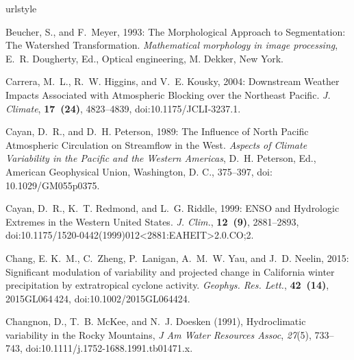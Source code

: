 \documentclass[final, double]{ua-thesis}
\begin{document}
\begin{thebibliography}{}
\providecommand{\natexlab}[1]{#1}
\providecommand{\url}[1]{\texttt{#1}}
\renewcommand{\UrlFont}{\rmfamily}
\providecommand{\urlprefix}{URL }
\expandafter\ifx\csname urlstyle\endcsname\relax
  \providecommand{\doi}[1]{doi:\discretionary{}{}{}#1}\else
  \providecommand{\doi}{doi:\discretionary{}{}{}\begingroup
  \urlstyle{rm}\Url}\fi
\providecommand{\eprint}[2][]{\url{#2}}

Beucher, S., and F.~Meyer, 1993: The {Morphological} {Approach} to
  {Segmentation}: {The} {Watershed} {Transformation}. \textit{Mathematical
  morphology in image processing}, E.~R. Dougherty, Ed., Optical engineering,
  M. Dekker, New York.

Carrera, M.~L., R.~W. Higgins, and V.~E. Kousky, 2004: Downstream {Weather}
  {Impacts} {Associated} with {Atmospheric} {Blocking} over the {Northeast}
  {Pacific}. \textit{J. Climate}, \textbf{17~(24)}, 4823--4839,
  \doi{10.1175/JCLI-3237.1}.

Cayan, D.~R., and D.~H. Peterson, 1989: The {Influence} of {North} {Pacific}
  {Atmospheric} {Circulation} on {Streamflow} in the {West}. \textit{Aspects of
  {Climate} {Variability} in the {Pacific} and the {Western} {Americas}}, D.~H.
  Peterson, Ed., American Geophysical Union, Washington, D. C., 375--397,
  doi: 10.1029/GM055p0375.

Cayan, D.~R., K.~T. Redmond, and L.~G. Riddle, 1999: {ENSO} and {Hydrologic}
  {Extremes} in the {Western} {United} {States}. \textit{J. Clim.},
  \textbf{12~(9)}, 2881--2893,
  \doi{10.1175/1520-0442(1999)012<2881:EAHEIT>2.0.CO;2}.

Chang, E. K.~M., C.~Zheng, P.~Lanigan, A.~M.~W. Yau, and J.~D. Neelin, 2015:
  Significant modulation of variability and projected change in {California}
  winter precipitation by extratropical cyclone activity. \textit{Geophys. Res.
  Lett.}, \textbf{42~(14)}, 2015GL064\,424, \doi{10.1002/2015GL064424}.

Changnon, D., T.~B. McKee, and N.~J. Doesken (1991), Hydroclimatic variability
  in the {Rocky} {Mountains}, \textit{J Am Water Resources Assoc},
  \textit{27}(5), 733--743, \doi{10.1111/j.1752-1688.1991.tb01471.x}.


\end{thebibliography}
\end{document}
